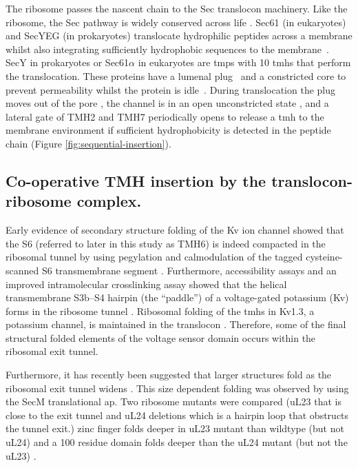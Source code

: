 The ribosome passes the nascent chain to the Sec translocon machinery.
Like the ribosome, the Sec pathway is widely conserved across life \cite{Cao2003}.
Sec61 (in eukaryotes) and SecYEG (in prokaryotes) translocate hydrophilic peptides across a membrane whilst also integrating sufficiently hydrophobic sequences to the membrane~\cite{Junne2010, Rapoport2012, Shao2011, Cymer2015}.
SecY in prokaryotes or Sec61$\alpha$ in eukaryotes are \gls{tmp}s with 10 \gls{tmh}s that perform the translocation.
These proteins have a lumenal plug~\cite{Tam2005, Junne2006} and a constricted core to prevent permeability whilst the protein is idle~\cite{Junne2010}.
During translocation the plug moves out of the pore \cite{Li2016}, the channel is in an open unconstricted state \cite{Junne2010}, and a lateral gate of TMH2 and TMH7 \cite{Berg} periodically opens to release a \gls{tmh} to the membrane environment if sufficient hydrophobicity is detected in the peptide chain \cite{Junne2010, Egea2010}(Figure \ref{fig:sequential-insertion}).


\subsection{Co-operative TMH insertion by the translocon-ribosome complex.}

Early evidence of secondary structure folding of the Kv ion channel showed that the S6 (referred to later in this study as TMH6) is indeed compacted in the ribosomal tunnel by using pegylation and calmodulation of the tagged cysteine-scanned S6 transmembrane segment \cite{Lu2005}.
Furthermore, accessibility assays and an improved intramolecular crosslinking assay showed that the helical transmembrane S3b–S4 hairpin (the “paddle”) of a voltage-gated potassium (Kv) forms in the ribosome tunnel \cite{Tu2014}.
Ribosomal folding of the \gls{tmh}s in Kv1.3, a potassium channel, is maintained in the translocon \cite{Tu2010a}.
Therefore, some of the final structural folded elements of the voltage sensor domain occurs within the ribosomal exit tunnel.

Furthermore, it has recently been suggested that larger structures fold as the ribosomal exit tunnel widens \cite{Kudva2018}.
This size dependent folding was observed by using the SecM translational \gls{ap}.
Two ribosome mutants were compared (uL23 that is close to the exit tunnel and uL24 deletions which is a hairpin loop that obstructs the tunnel exit.) zinc finger folds deeper in uL23 mutant than wildtype (but not uL24) and a 100 residue domain folds deeper than the uL24 mutant (but not the uL23) \cite{Kudva2018}.

